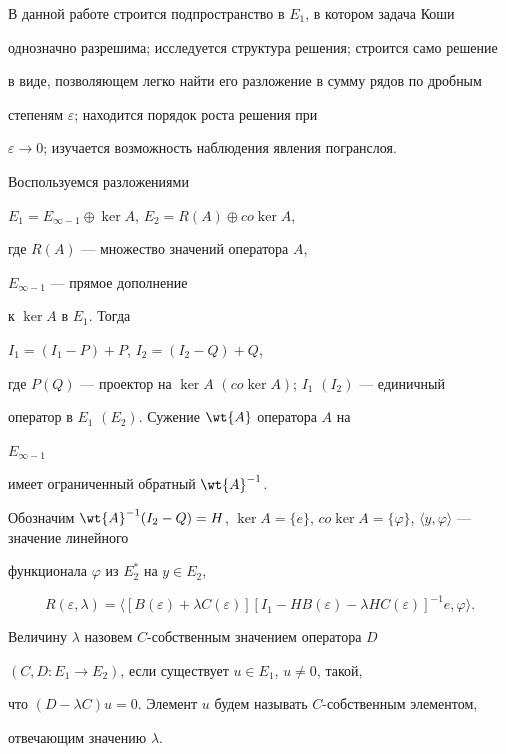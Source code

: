 В данной работе строится подпространство в $E_1$, в котором задача Коши


однозначно разрешима; исследуется структура решения; строится само решение


в виде, позволяющем легко найти его разложение в сумму рядов по дробным


степеням $\varepsilon$; находится порядок роста решения при


$\varepsilon\to 0$; изучается возможность наблюдения явления погранслоя.


Воспользуемся разложениями


$E_1 = E_{\infty-1}\oplus \ker A$, $E_2=R(A)\oplus co\ker A$,


где $R(A)$ --- множество значений оператора $A$,


$E_{\infty-1}$ --- прямое дополнение


к $\ker A$ в $E_1$. Тогда


$I_1=(I_1 - P)+P$, $I_2=(I_2 - Q)+Q$,


где $P(Q)$ --- проектор на $\ker A$ $(co\ker A)$; $I_1$ $(I_2)$ --- единичный


оператор в $E_1$ $(E_2)$. Сужение $\wt{A}$ оператора $A$ на


$E_{\infty-1}$


имеет ограниченный обратный $\wt{A}^{-1}$.





Обозначим $\wt{A}^{-1}(I_{2}-Q)=H$, $\ker A =\{e\}$, $co\ker A = 


\{ \varphi\}$, $\langle y,\varphi\rangle$ --- значение линейного


функционала $\varphi$ из $E^{*}_{2}$ на $y \in E_2$,


$$


R(\varepsilon,\lambda)=\langle[B(\varepsilon)+\lambda C(\varepsilon)]


[I_1 - HB(\varepsilon)-\lambda HC(\varepsilon)]^{-1}e,\varphi\rangle.


$$





Величину $\lambda$ назовем $C$-собственным значением оператора $D$


$(C,D:E_1\to E_2)$, если существует $u\in E_1$, $u\ne 0$, такой,


что $(D-\lambda C)u=0$. Элемент $u$ будем называть $C$-собственным элементом,


отвечающим значению $\lambda$.





